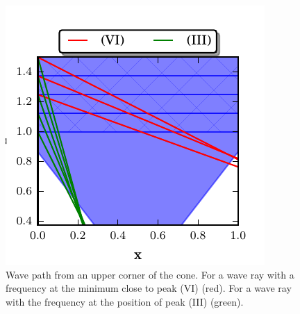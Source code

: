 {\begin{figure}[!b]
  \begin{minipage}[c]{0.4\textwidth}
      \centering
      \includegraphics{gfx/cone/discussion/corners.pdf}
  \end{minipage}
  \hfill
  \begin{minipage}[c]{0.5\textwidth}
      \caption{\label{fig:conediscuss:corners}
        Wave path from an upper corner of the cone.
        For a wave ray with a frequency at the minimum close to peak (\RN{6}) (red).
        For a wave ray with the frequency at the position of peak (\RN{3}) (green).
      }
  \end{minipage}
\end{figure}

}
